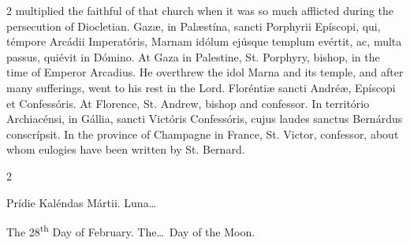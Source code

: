 \begin{paracol}{2}
 multiplied the faithful of that church when it was so much afflicted during 
 the persecution of Diocletian.
\switchcolumn*
{}
Gazæ, in Palæstína, sancti Porphyrii Epíscopi, 
 qui, témpore Arcádii Imperatóris, Marnam idólum ejúsque templum evértit, ac, 
 multa passus, quiévit in Dómino.
\switchcolumn
{}
At Gaza in Palestine, St. Porphyry, bishop, in the time of Emperor Arcadius. 
 He overthrew the idol Marna and its temple, and after many sufferings, went 
 to his rest in the Lord.
\switchcolumn*
{}
Floréntiæ sancti Andréæ, Epíscopi et 
 Confessóris.
\switchcolumn
{}
At Florence, St. Andrew, bishop and confessor.
\switchcolumn*
{}
In território Archiacénsi, in Gállia, sancti Victóris Confessóris, cujus 
 laudes sanctus Bernárdus conscrípsit.
\switchcolumn
{}
In the province of Champagne in France, St. Victor, confessor, about whom 
 eulogies have been written by St. Bernard.
\switchcolumn*
{}
\end{paracol}


\begin{paracol}{2}
\begin{center}{\color{gregoriocolor} Prídie Kaléndas Mártii. 
 Luna\dots\ }\end{center}
\switchcolumn
{}
\begin{center}{\color{gregoriocolor} The 28\textsuperscript{th} Day of February. The\dots\ Day of the Moon.}\end{center}
\end{paracol}

